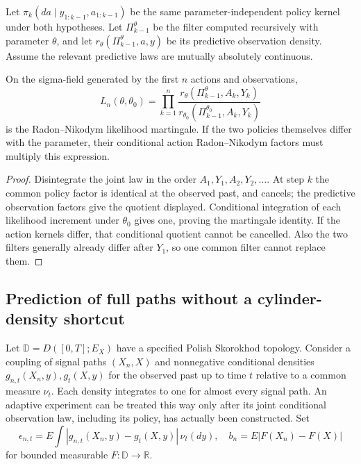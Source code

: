Let $\pi_k(da\mid y_{1:k-1},a_{1:k-1})$ be the same parameter-independent
policy kernel under both hypotheses.  Let $\Pi_{k-1}^\theta$ be the filter
computed recursively with parameter $\theta$, and let
$r_\theta(\Pi_{k-1}^\theta,a,y)$ be its predictive observation density.
Assume the relevant predictive laws are mutually absolutely continuous.

\begin{proposition}
\label{prop:r33-c2-likelihood}
On the sigma-field generated by the first $n$ actions and observations,
\[
 L_n(\theta,\theta_0)=
 \prod_{k=1}^n
 \frac{r_\theta(\Pi_{k-1}^\theta,A_k,Y_k)}
      {r_{\theta_0}(\Pi_{k-1}^{\theta_0},A_k,Y_k)}
\]
is the Radon--Nikodym likelihood martingale.  If the two policies themselves
differ with the parameter, their conditional action Radon--Nikodym factors
must multiply this expression.
\end{proposition}
\begin{proof}
Disintegrate the joint law in the order $A_1,Y_1,A_2,Y_2,\ldots$.
At step $k$ the common policy factor is identical at the observed past, and
cancels; the predictive observation factors give the quotient displayed.
Conditional integration of each likelihood increment under $\theta_0$ gives
one, proving the martingale identity.  If the action kernels differ, that
conditional quotient cannot be cancelled.  Also the two filters generally
already differ after $Y_1$, so one common filter cannot replace them.
\end{proof}

\subsection{Prediction of full paths without a cylinder-density shortcut}

Let $\mathbb D=D([0,T];E_X)$ have a specified Polish Skorokhod topology.
Consider a coupling of signal paths $(X_n,X)$ and nonnegative conditional
densities $g_{n,t}(X_n,y),g_t(X,y)$ for the observed past up to time $t$
relative to a common measure $\nu_t$.  Each density integrates to one for
almost every signal path.  An adaptive experiment can be treated this way
only after its joint conditional observation law, including its policy, has
actually been constructed.
Set
\[
 \epsilon_{n,t}=E\int|g_{n,t}(X_n,y)-g_t(X,y)|\,\nu_t(dy),
 \quad b_n=E|F(X_n)-F(X)|
\]
for bounded measurable $F:\mathbb D\to\mathbb R$.

